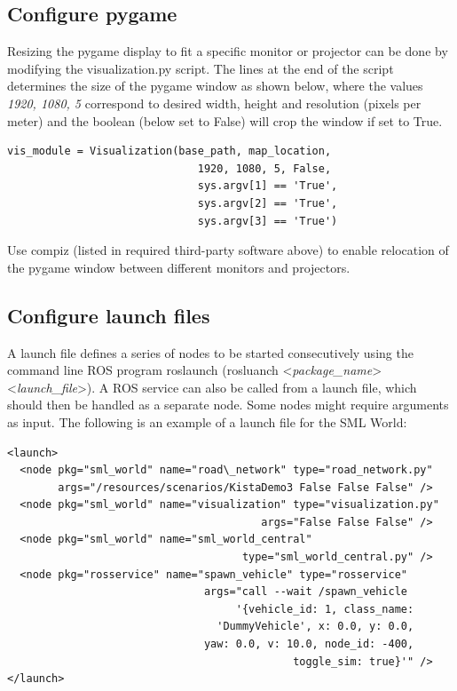 \documentclass[11pt,a4paper]{book}
\begin{document}
\subsection{Configure pygame}
Resizing the pygame display to fit a specific monitor or projector can be done by modifying the visualization.py script. The lines at the end of the script determines the size of the pygame window as shown below, where the values \textit{1920, 1080, 5} correspond to desired width, height and resolution (pixels per meter) and the boolean (below set to False) will crop the window if set to True.

\begin{verbatim}
vis_module = Visualization(base_path, map_location, 
                              1920, 1080, 5, False, 
                              sys.argv[1] == 'True',
                              sys.argv[2] == 'True', 
                              sys.argv[3] == 'True')
\end{verbatim}

\noindent Use compiz (listed in required third-party software above) to enable relocation of the pygame window between different monitors and projectors.

\subsection{Configure launch files}
A launch file defines a series of nodes to be started consecutively using the command line ROS program roslaunch (rosluanch <\textit{package\_name}> <\textit{launch\_file}>). A ROS service can also be called from a launch file, which should then be handled as a separate node. Some nodes might require arguments as input. The following is an example of a launch file for the SML World: \\

\begin{verbatim}
<launch>
  <node pkg="sml_world" name="road\_network" type="road_network.py" 
        args="/resources/scenarios/KistaDemo3 False False False" />
  <node pkg="sml_world" name="visualization" type="visualization.py" 
                                        args="False False False" />
  <node pkg="sml_world" name="sml_world_central" 
                                     type="sml_world_central.py" />
  <node pkg="rosservice" name="spawn_vehicle" type="rosservice" 
                               args="call --wait /spawn_vehicle 
                                    '{vehicle_id: 1, class_name: 
                                 'DummyVehicle', x: 0.0, y: 0.0, 
                               yaw: 0.0, v: 10.0, node_id: -400, 
                                             toggle_sim: true}'" />
</launch>
\end{verbatim}
\end{document}
